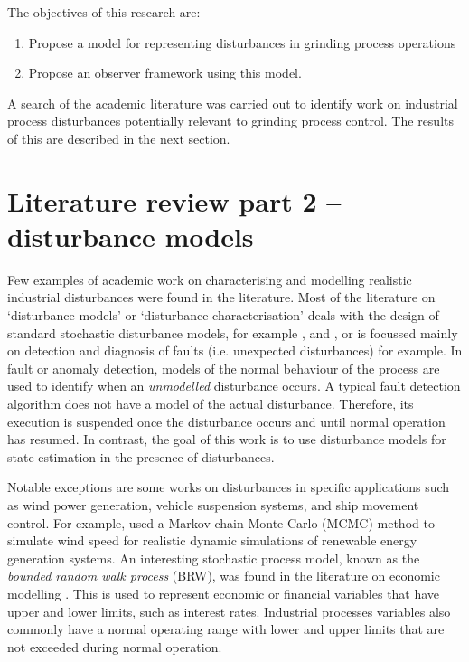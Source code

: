 The objectives of this research are:
\begin{enumerate}
	\item Propose a model for representing disturbances in grinding process operations
	\item Propose an observer framework using this model.
\end{enumerate}
A search of the academic literature was carried out to identify work on industrial process disturbances potentially relevant to grinding process control. The results of this are described in the next section.


\section{Literature review part 2 – disturbance models} \label{sec:lit-disturb-models}

Few examples of academic work on characterising and modelling realistic industrial disturbances were found in the literature. Most of the literature on `disturbance models' or `disturbance characterisation' deals with the design of standard stochastic disturbance models, for example \cite{muske_disturbance_2002}, and \cite{pannocchia_robust_2003}, or is focussed mainly on detection and diagnosis of faults (i.e. unexpected disturbances) \citep{thornhill_advances_2007} for example. In fault or anomaly detection, models of the normal behaviour of the process are used to identify when an \textit{unmodelled} disturbance occurs. A typical fault detection algorithm does not have a model of the actual disturbance. Therefore, its execution is suspended once the disturbance occurs and until normal operation has resumed. In contrast, the goal of this work is to use disturbance models for state estimation in the presence of disturbances.

Notable exceptions are some works on disturbances in specific applications such as wind power generation, vehicle suspension systems, and ship movement control. For example, \cite{papaefthymiou_mcmc_2008} used a Markov-chain Monte Carlo (MCMC) method to simulate wind speed for realistic dynamic simulations of renewable energy generation systems. An interesting stochastic process model, known as the \textit{bounded random walk process} (\gls{BRW}), was found in the literature on economic modelling \citep{nicolau_stationary_2002}. This is used to represent economic or financial variables that have upper and lower limits, such as interest rates. Industrial processes variables also commonly have a normal operating range with lower and upper limits that are not exceeded during normal operation.

